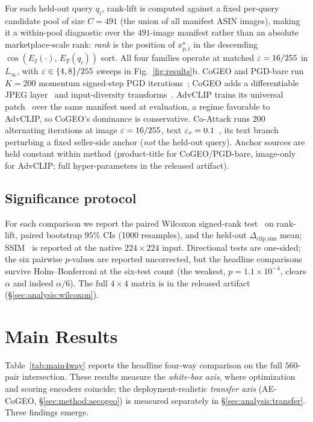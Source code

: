 For each held-out query $q_i$, rank-lift is computed against a fixed per-query candidate pool of size $C{=}491$ (the union of all manifest ASIN images), making it a within-pool diagnostic over the $491$-image manifest rather than an absolute marketplace-scale rank: \emph{rank} is the position of $x_{p,i}^{\star}$ in the descending $\cos(E_I(\cdot),\,E_T(q_i))$ sort. All four families operate at matched $\varepsilon = 16/255$ in $L_\infty$, with $\varepsilon \in \{4, 8\}/255$ sweeps in Fig.~\ref{fig:results}b. CoGEO and PGD-bare run $K = 200$ momentum signed-step PGD iterations~\cite{madry2018pgd,dong2018mifgsm}; CoGEO adds a differentiable JPEG layer~\cite{shin2017diffjpeg} and input-diversity transforms~\cite{xie2019dim,lin2020sim}. AdvCLIP trains its universal patch~\cite{moosavidezfooli2017uap,thys2019adversarialpatches,zhou2023advclip} over the same manifest used at evaluation, a regime favorable to AdvCLIP, so CoGEO's dominance is conservative. Co-Attack runs $200$ alternating iterations at image $\varepsilon = 16/255$, text $\varepsilon_v = 0.1$~\cite{zhang2022coattack}, its text branch perturbing a fixed seller-side anchor (\emph{not} the held-out query). Anchor sources are held constant within method (product-title for CoGEO/PGD-bare, image-only for AdvCLIP; full hyper-parameters in the released artifact).

\subsection{Significance protocol}

For each comparison we report the paired Wilcoxon signed-rank test~\cite{wilcoxon1945individual} on rank-lift, paired bootstrap $95\%$ CIs (1000 resamples), and the held-out $\Delta_{\mathrm{clip\_sim}}$ mean; SSIM~\cite{wang2004ssim} is reported at the native $224\times 224$ input. Directional tests are one-sided; the six pairwise $p$-values are reported uncorrected, but the headline comparisons survive Holm--Bonferroni at the six-test count (the weakest, $p = 1.1 \times 10^{-4}$, clears $\alpha$ and indeed $\alpha/6$). The full $4 \times 4$ matrix is in the released artifact (\S\ref{sec:analysis:wilcoxon}).

\section{Main Results}
\label{sec:experiments}

Table~\ref{tab:main4way} reports the headline four-way comparison on the full $560$-pair intersection. These results measure the \emph{white-box axis}, where optimization and scoring encoders coincide; the deployment-realistic \emph{transfer axis} (AE-CoGEO, \S\ref{sec:method:aecogeo}) is measured separately in \S\ref{sec:analysis:transfer}. Three findings emerge.

